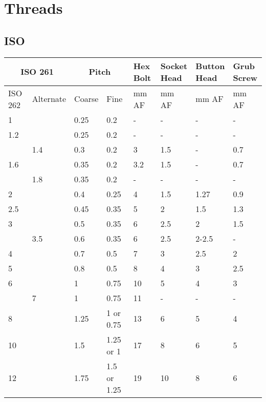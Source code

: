 \chapter{Threads}
\section{ISO}

\begin{table}[h]
\begin{longtable}{ll|ll|llll}
	\multicolumn{2}{c}{ISO 261}
    &\multicolumn{2}{c}{Pitch}
    &\specialcell{Hex\\Bolt}
    &\specialcell{Socket\\Head}
    &\specialcell{Button\\Head}
    &\specialcell{Grub\\Screw}
    \\
\hline
	ISO 262
    &Alternate
    &Coarse
    &Fine
    & mm AF
    & mm AF
    & mm AF
    & mm AF
    \\
\hline
    1   &    &0.25 &0.2        &-   &-      &-      &-    \\
    1.2 &    &0.25 &0.2        &-   &-      &-      &-    \\
        &1.4 &0.3  &0.2        &3   &1.5    &-      &0.7 \\
    1.6 &    &0.35 &0.2        &3.2 &1.5    &-      &0.7 \\
        &1.8 &0.35 &0.2        &-   &-      &-      &-    \\
    2   &    &0.4  &0.25       &4   &1.5    &1.27   &0.9 \\
    2.5 &    &0.45 &0.35       &5   &2      &1.5    &1.3 \\
    3   &    &0.5  &0.35       &6   &2.5    &2      &1.5 \\
        &3.5 &0.6  &0.35       &6   &2.5    &2-2.5  &-    \\
    4   &    &0.7  &0.5        &7   &3      &2.5    &2 \\
    5   &    &0.8  &0.5        &8   &4      &3      &2.5 \\
    6   &    &1    &0.75       &10  &5      &4      &3 \\
        &7   &1    &0.75       &11  &-      &-      &-    \\
    8   &    &1.25 &1 or 0.75  &13  &6      &5      &4 \\
    10  &    &1.5  &1.25 or 1  &17  &8      &6      &5 \\
    12  &    &1.75 &1.5 or 1.25&19  &10     &8      &6 \\

\end{longtable}
\end{table}
